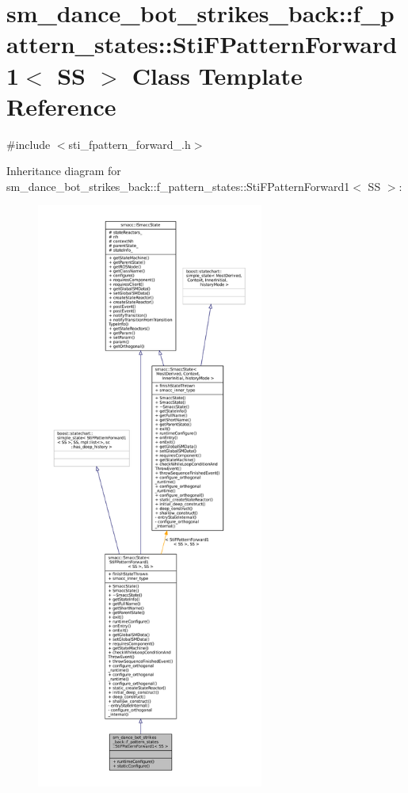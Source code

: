 \hypertarget{structsm__dance__bot__strikes__back_1_1f__pattern__states_1_1StiFPatternForward1}{}\section{sm\+\_\+dance\+\_\+bot\+\_\+strikes\+\_\+back\+:\+:f\+\_\+pattern\+\_\+states\+:\+:Sti\+F\+Pattern\+Forward1$<$ SS $>$ Class Template Reference}
\label{structsm__dance__bot__strikes__back_1_1f__pattern__states_1_1StiFPatternForward1}


{\ttfamily \#include $<$sti\+\_\+fpattern\+\_\+forward\+\_.\+h$>$}



Inheritance diagram for sm\+\_\+dance\+\_\+bot\+\_\+strikes\+\_\+back\+:\+:f\+\_\+pattern\+\_\+states\+:\+:Sti\+F\+Pattern\+Forward1$<$ SS $>$\+:
\nopagebreak
\begin{figure}[H]
\begin{center}
\leavevmode
\includegraphics[height=550pt]{structsm__dance__bot__strikes__back_1_1f__pattern__states_1_1StiFPatternForward1__inherit__graph}
\end{center}
\end{figure}


